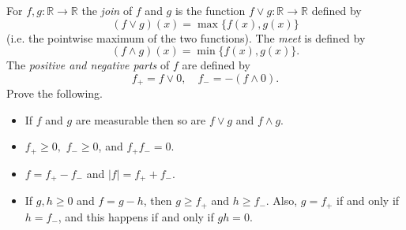 \documentclass[12pt]{article}
\newenvironment{problem}[2][Problem]{\begin{trivlist}
\item[\hskip \labelsep {\bfseries #1}\hskip \labelsep {\bfseries
#2.}]}{\end{trivlist}}
\begin{document}
\begin{problem}{48}
  For $f,g : \mathbb{R} \to \mathbb{R}$ the \textit{join} of $f$ and $g$ is the function $f \vee g : \mathbb{R} \to \mathbb{R}$ defined by $$(f \vee g)(x) = \max\{f(x),g(x)\}$$ (i.e. the pointwise maximum of the two functions). The \textit{meet} is defined by $$(f \wedge g)(x) = \min\{f(x),g(x)\}.$$ The \textit{positive and negative parts} of $f$ are defined by $$f_+ = f \vee 0, \hspace{1em} f_- = -(f \wedge 0).$$ Prove the following.
  \begin{itemize}
    \item[(i)] If $f$ and $g$ are measurable then so are $f \vee g$ and $f \wedge g$.
    \item[(ii)] $f_+ \geq 0,$ $f_- \geq 0$, and $f_+f_- = 0$.
    \item[(iii)] $f = f_+-f_-$ and $|f| = f_++f_-$.
    \item[(iv)] If $g,h \geq 0$ and $f = g - h$, then $g \geq f_+$ and $h \geq f_-$. Also, $g = f_+$ if and only if $h = f_-$, and this happens if and only if $gh = 0$.   
  \end{itemize}
\end{problem}
\end{document}
